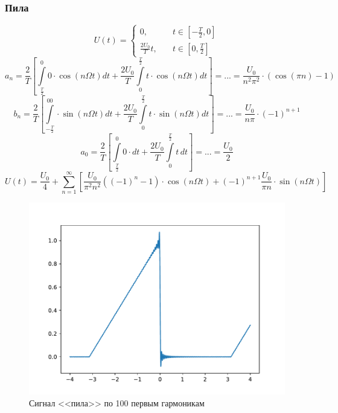 \subsubsection{Пила}
\begin{equation}
	U(t)=\left\{
	\begin{aligned}
		0, \quad &t\in [-\frac{T}{2},0]\\
		\frac{2U_0}{T}t, \quad &t\in[0, \frac{T}{2}]
	\end{aligned}
	\right.
\end{equation}
\begin{equation}
	a_n=\frac{2}{T}\left[\int\limits_{\frac{T}{2}}^0 0\cdot\cos{(n\Omega t)} dt+\frac{2U_0}{T}\int\limits_0^{\frac{T}{2}}t\cdot\cos(n\Omega t)dt \right]=...=\frac{U_0}{n^2\pi^2}\cdot(\cos(\pi n)-1)
\end{equation}
\begin{equation}
	b_n=\frac{2}{T}\left[\int\limits_{-\frac{T}{2}}^00\cdot\sin(n\Omega t)dt + \frac{2U_0}{T}\int\limits_0^{\frac{T}{2}}t\cdot\sin(n\Omega t)dt\right]=...=\frac{U_0}{n\pi}\cdot(-1)^{n+1}
\end{equation}
\begin{equation}
	a_0=\frac{2}{T}\left[\int\limits_{\frac{T}{2}}^0 0\cdot dt+\frac{2U_0}{T}\int\limits_0^{\frac{T}{2}}t \,dt \right]=...=\frac{U_0}{2}
\end{equation}
\begin{equation}
	U(t)=\frac{U_0}{4}+\sum_{n=1}^{\infty}\left[\frac{U_0}{\pi^2n^2}\left((-1)^n-1\right)\cdot\cos(n\Omega t)+ (-1)^{n+1}\frac{U_0}{\pi n}\cdot\sin(n\Omega t)\right]
\end{equation}
\begin{figure}[tb]
	\centering
	\includegraphics[]{plot/pila}
	\caption{Сигнал <<пила>> по 100 первым гармоникам}
	\label{fig:figure1}
\end{figure}

